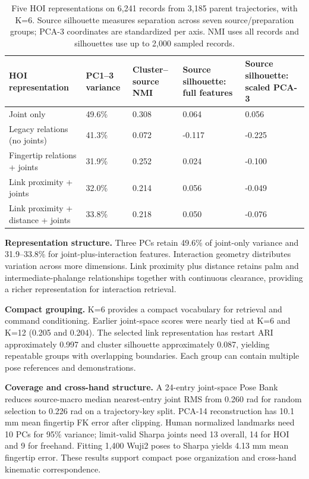 \documentclass[10pt,twocolumn]{article}
\begin{document}
\begin{table}[t]
\small
\begin{tabularx}{\textwidth}{@{}lXXXX@{}}
\toprule
HOI representation & PC1--3 variance & Cluster--source NMI & Source silhouette: full features & Source silhouette: scaled PCA-3 \\
\midrule
Joint only & 49.6\% & 0.308 & 0.064 & 0.056 \\
Legacy relations (no joints) & 41.3\% & 0.072 & -0.117 & -0.225 \\
Fingertip relations + joints & 31.9\% & 0.252 & 0.024 & -0.100 \\
Link proximity + joints & 32.0\% & 0.214 & 0.056 & -0.049 \\
Link proximity + distance + joints & 33.8\% & 0.218 & 0.050 & -0.076 \\
\bottomrule
\end{tabularx}
\caption{Five HOI representations on 6,241 records from 3,185 parent trajectories, with K=6. Source silhouette measures separation across seven source/preparation groups; PCA-3 coordinates are standardized per axis. NMI uses all records and silhouettes use up to 2,000 sampled records.}
\end{table}

\textbf{Representation structure.} Three PCs retain 49.6\% of joint-only variance and 31.9--33.8\% for joint-plus-interaction features. Interaction geometry distributes variation across more dimensions. Link proximity plus distance retains palm and intermediate-phalange relationships together with continuous clearance, providing a richer representation for interaction retrieval.

\textbf{Compact grouping.} K=6 provides a compact vocabulary for retrieval and command conditioning. Earlier joint-space scores were nearly tied at K=6 and K=12 (0.205 and 0.204). The selected link representation has restart ARI approximately 0.997 and cluster silhouette approximately 0.087, yielding repeatable groups with overlapping boundaries. Each group can contain multiple pose references and demonstrations.

\textbf{Coverage and cross-hand structure.} A 24-entry joint-space Pose Bank reduces source-macro median nearest-entry joint RMS from 0.260 rad for random selection to 0.226 rad on a trajectory-key split. PCA-14 reconstruction has 10.1 mm mean fingertip FK error after clipping. Human normalized landmarks need 10 PCs for 95\% variance; limit-valid Sharpa joints need 13 overall, 14 for HOI and 9 for freehand. Fitting 1,400 Wuji2 poses to Sharpa yields 4.13 mm mean fingertip error. These results support compact pose organization and cross-hand kinematic correspondence.
\end{document}
